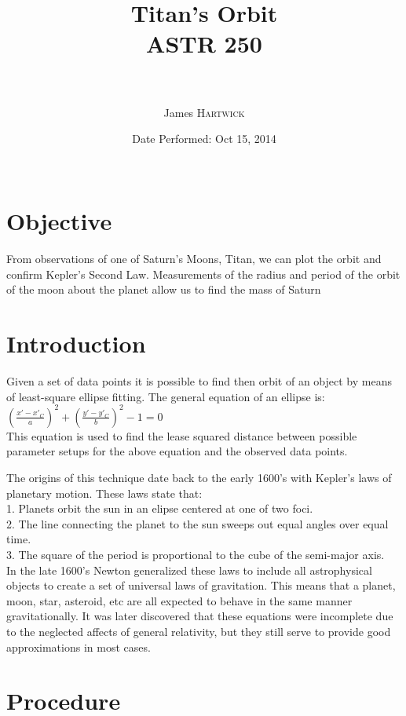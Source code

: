 \documentclass{article}
\title{Titan's Orbit \\ ASTR 250\\ \ \\ } %
\author{James \textsc{Hartwick}} %
\date{Date Performed: Oct 15, 2014\\ \ } %
\begin{document}
\maketitle %


\section{Objective}
From observations of one of Saturn's Moons, Titan, we can plot the orbit and confirm Kepler's Second Law. Measurements of the radius and period of the orbit of the moon about the planet allow us to find the mass of Saturn
\section{Introduction}
Given a set of data points it is possible to find then orbit of an object by means of least-square ellipse fitting. The general equation of an ellipse is:\\

$(\frac{x'-x'_C}{a})^2+(\frac{y'-y'_C}{b})^2-1=0$\\

This equation is used to find the lease squared distance between possible parameter setups for the above equation and the observed data points.

The origins of this technique date back to the early 1600's with Kepler's laws of planetary motion. These laws state that:\\

1. Planets orbit the sun in an elipse centered at one of two foci.\\
2. The line connecting the planet to the sun sweeps out equal angles over equal time.\\
3. The square of the period is proportional to the cube of the semi-major axis.\\

In the late 1600's Newton generalized these laws to include all astrophysical objects to create a set of universal laws of gravitation. This means that a planet, moon, star, asteroid, etc are all expected to behave in the same manner gravitationally. It was later discovered that these equations were incomplete due to the neglected affects of general relativity, but they still serve to provide good approximations in most cases.
\section{Procedure}
\end{document}
